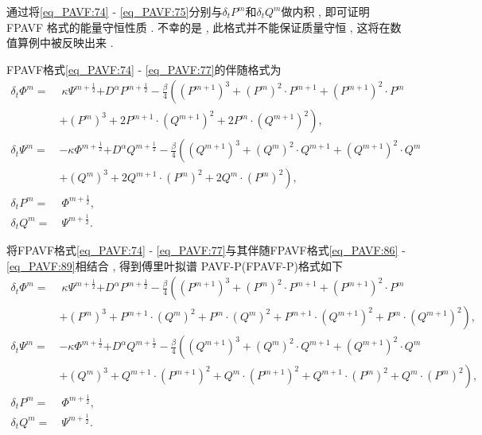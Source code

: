 通过将\eqref{eq_PAVF:74} - \eqref{eq_PAVF:75}分别与$\delta_t P^{m}$和$\delta_t Q^{m}$做内积 , 即可证明 FPAVF 格式的能量守恒性质 . 
不幸的是 , 此格式并不能保证质量守恒 , 这将在数值算例中被反映出来 . 

FPAVF格式\eqref{eq_PAVF:74} - \eqref{eq_PAVF:77}的伴随格式为
\begin{align}
\delta_{t} \varPhi^{m}=&~\kappa \Psi^{m+\frac{1}{2}}{+D^{\alpha} P^{m+\frac{1}{2}}}-\frac{\beta}{4}\left( (P^{m+1})^3+ (P^{m})^{2}\cdot P^{m+1}+(P^{m+1})^{2}\cdot P^{m}\right . \nonumber\\
	&\left. + (P^{m})^{3}+2 P^{m+1}\cdot (Q^{m+1})^{2}+2 P^{m}\cdot (Q^{m+1})^{2}\right) , \label{eq_PAVF:86}\\
\delta_{t} \Psi^{m}=&-\kappa \varPhi^{m+\frac{1}{2}}{+D^{\alpha} Q^{m+\frac{1}{2}}}-\frac{\beta}{4}\left( (Q^{m+1})^3+ (Q^{m})^{2}\cdot Q^{m+1}+ (Q^{m+1})^{2}\cdot Q^{m}\right . \nonumber\\
	&\left . + (Q^{m})^{3}+2 Q^{m+1}\cdot (P^{m})^{2}+2 Q^{m}\cdot (P^{m})^{2}\right) , \label{eq_PAVF:87}\\
\delta_{t} P^{m}=&~\varPhi^{m+\frac{1}{2}} , \label{eq_PAVF:88}\\
\delta_{t} Q^{m}=&~\Psi^{m+\frac{1}{2}} . \label{eq_PAVF:89}
\end{align}

将FPAVF格式\eqref{eq_PAVF:74} - \eqref{eq_PAVF:77}与其伴随FPAVF格式\eqref{eq_PAVF:86} - \eqref{eq_PAVF:89}相结合 , 得到傅里叶拟谱 PAVF-P(FPAVF-P)格式如下
\begin{align}
\delta_{t} \varPhi^{m}=&~\kappa \Psi^{m+\frac{1}{2}}{+D^{\alpha} P^{m+\frac{1}{2}}}-\frac{\beta}{4}\left((P^{m+1})^3+(P^{m})^{2}\cdot P^{m+1}+(P^{m+1})^{2}\cdot P^{m}\right . \nonumber\\
	&\left . +(P^{m})^{3}+P^{m+1}\cdot (Q^{m})^{2}+P^{m}\cdot (Q^{m})^{2}+P^{m+1}\cdot (Q^{m+1})^{2}+P^{m}\cdot (Q^{m+1})^{2}\right) , \label{eq_PAVF:98}\\
\delta_{t} \Psi^{m}=&-\kappa \varPhi^{m+\frac{1}{2}}{+D^{\alpha} Q^{m+\frac{1}{2}}}-\frac{\beta}{4}\left((Q^{m+1})^3+(Q^{m})^{2}\cdot Q^{m+1}+(Q^{m+1})^{2}\cdot Q^{m}\right . \nonumber\\
	&\left . +(Q^{m})^{3}+Q^{m+1}\cdot (P^{m+1})^{2}+Q^{m}\cdot (P^{m+1})^{2}+Q^{m+1}\cdot (P^{m})^{2}+Q^{m}\cdot (P^{m})^{2}\right) , \label{eq_PAVF:99}\\
\delta_{t} P^{m}=&~\varPhi^{m+\frac{1}{2}} , \label{eq_PAVF:100}\\
\delta_{t} Q^{m}=&~\Psi^{m+\frac{1}{2}} . \label{eq_PAVF:101}
\end{align}

